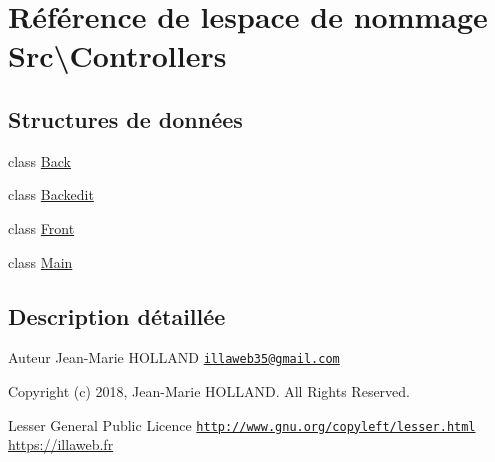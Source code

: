 \hypertarget{namespace_src_1_1_controllers}{}\section{Référence de l\textquotesingle{}espace de nommage Src\textbackslash{}Controllers}
\label{namespace_src_1_1_controllers}
\subsection*{Structures de données}
\begin{DoxyCompactItemize}
\item 
class \hyperlink{class_src_1_1_controllers_1_1_back}{Back}
\item 
class \hyperlink{class_src_1_1_controllers_1_1_backedit}{Backedit}
\item 
class \hyperlink{class_src_1_1_controllers_1_1_front}{Front}
\item 
class \hyperlink{class_src_1_1_controllers_1_1_main}{Main}
\end{DoxyCompactItemize}


\subsection{Description détaillée}
\begin{DoxyAuthor}{Auteur}
Jean-\/\+Marie H\+O\+L\+L\+A\+ND \href{mailto:illaweb35@gmail.com}{\tt illaweb35@gmail.\+com} 
\end{DoxyAuthor}
\begin{DoxyCopyright}{Copyright}
(c) 2018, Jean-\/\+Marie H\+O\+L\+L\+A\+ND. All Rights Reserved.
\end{DoxyCopyright}
Lesser General Public Licence \href{http://www.gnu.org/copyleft/lesser.html}{\tt http\+://www.\+gnu.\+org/copyleft/lesser.\+html} \hyperlink{}{https\+://illaweb.\+fr}